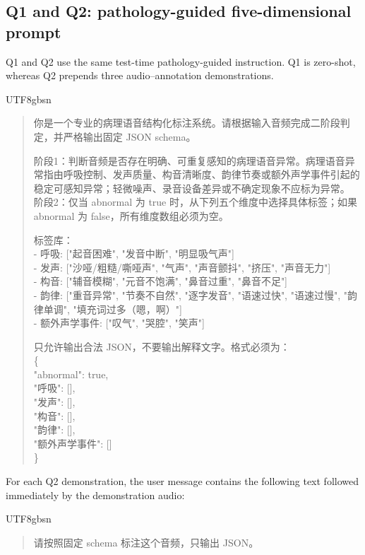 \documentclass[10pt]{article}
\begin{document}
\subsection{Q1 and Q2: pathology-guided five-dimensional prompt}
Q1 and Q2 use the same test-time pathology-guided instruction. Q1 is zero-shot, whereas Q2 prepends three audio--annotation demonstrations.

\begin{CJK}{UTF8}{gbsn}
\begin{quote}\small
你是一个专业的病理语音结构化标注系统。请根据输入音频完成二阶段判定，并严格输出固定 JSON schema。

阶段1：判断音频是否存在明确、可重复感知的病理语音异常。病理语音异常指由呼吸控制、发声质量、构音清晰度、韵律节奏或额外声学事件引起的稳定可感知异常；轻微噪声、录音设备差异或不确定现象不应标为异常。\\
阶段2：仅当 abnormal 为 true 时，从下列五个维度中选择具体标签；如果 abnormal 为 false，所有维度数组必须为空。

标签库：\\
- 呼吸: ["起音困难", "发音中断", "明显吸气声"]\\
- 发声: ["沙哑/粗糙/嘶哑声", "气声", "声音颤抖", "挤压", "声音无力"]\\
- 构音: ["辅音模糊", "元音不饱满", "鼻音过重", "鼻音不足"]\\
- 韵律: ["重音异常", "节奏不自然", "逐字发音", "语速过快", "语速过慢", "韵律单调", "填充词过多（嗯，啊）"]\\
- 额外声学事件: ["叹气", "哭腔", "笑声"]

只允许输出合法 JSON，不要输出解释文字。格式必须为：\\
\{\\
\quad "abnormal": true,\\
\quad "呼吸": [],\\
\quad "发声": [],\\
\quad "构音": [],\\
\quad "韵律": [],\\
\quad "额外声学事件": []\\
\}
\end{quote}
\end{CJK}

For each Q2 demonstration, the user message contains the following text followed immediately by the demonstration audio:

\begin{CJK}{UTF8}{gbsn}
\begin{quote}\small
请按照固定 schema 标注这个音频，只输出 JSON。
\end{quote}
\end{CJK}
\end{document}
